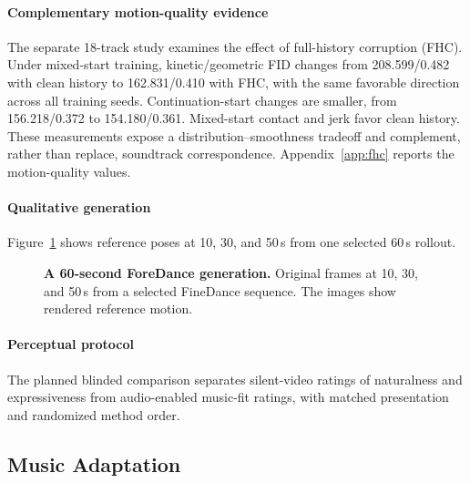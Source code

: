 \paragraph{Complementary motion-quality evidence}
The separate 18-track study examines the effect of full-history corruption
(FHC). Under mixed-start training, kinetic/geometric FID changes from
208.599/0.482 with clean history to 162.831/0.410 with FHC, with the same
favorable direction across all training seeds. Continuation-start changes are
smaller, from 156.218/0.372 to 154.180/0.361. Mixed-start contact and jerk favor
clean history. These measurements expose a distribution--smoothness tradeoff
and complement, rather than replace, soundtrack correspondence.
Appendix~\ref{app:fhc} reports the motion-quality values.

\paragraph{Qualitative generation}
\label{sec:showcase}
Figure~\ref{fig:sequence} shows reference poses at 10, 30, and 50\,s from one
selected 60\,s rollout.
\begin{figure}[t]
\centering

\caption{\textbf{A 60-second ForeDance generation.} Original frames at 10, 30, and 50\,s from a selected FineDance sequence. The images show rendered reference motion.}
\label{fig:sequence}
\end{figure}

\paragraph{Perceptual protocol}
The planned blinded comparison separates silent-video ratings of naturalness
and expressiveness from audio-enabled music-fit ratings, with matched
presentation and randomized method order.

\subsection{Music Adaptation}
\label{sec:music_results}
